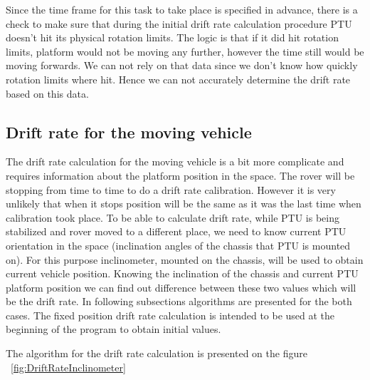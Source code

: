 Since the time frame for this task to take place is specified in advance, there is a check to make sure that during the initial drift rate calculation procedure PTU doesn't hit its physical rotation limits. The logic is that if it did hit rotation limits, platform would not be moving any further, however the time still would be moving forwards. We can not rely on that data since we don't know how quickly rotation limits where hit. Hence we can not accurately determine the drift rate based on this data.

\subsection{Drift rate for the moving vehicle}
The drift rate calculation for the moving vehicle is a bit more complicate and requires information about the platform position in the space. The rover will be stopping from time to time to do a drift rate calibration. However it is very unlikely that when it stops position will be the same as it was the last time when calibration took place. To be able to calculate drift rate, while PTU is being stabilized and rover moved to a different place, we need to know current PTU orientation in the space (inclination angles of the chassis that PTU is mounted on). For this purpose inclinometer, mounted on the chassis, will be used to obtain current vehicle position. Knowing the inclination of the chassis and current PTU platform position we can find out difference between these two values which will be the drift rate. In following subsections algorithms are presented for the both cases. The fixed position drift rate calculation is intended to be used at the beginning of the program to obtain initial values. 

The algorithm for the drift rate calculation is presented on the figure ~\ref{fig:DriftRateInclinometer}

